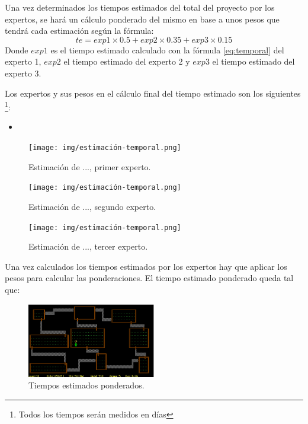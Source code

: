         Una vez determinados los tiempos estimados del total del proyecto por los expertos, se hará un cálculo ponderado del mismo en base a unos pesos que tendrá cada estimación según la fórmula:
        \begin{equation}
            te = exp1 \times 0.5 + exp2 \times 0.35 + exp3 \times 0.15 \label{eq:ponderado}
        \end{equation}
        Donde $exp1$ es el tiempo estimado calculado con la fórmula \ref{eq:temporal} del experto 1, $exp2$ el tiempo estimado del experto 2 y $exp3$ el tiempo estimado del experto 3.

        Los expertos y sus pesos en el cálculo final del tiempo estimado son los siguientes \footnote{Todos los tiempos serán medidos en días}:
        \begin{itemize}
            \item 
        \end{itemize}

        \begin{figure}
            \centering
            \texttt{[image: img/estimación-temporal.png]}
            \caption{Estimación de ..., primer experto.}
            \label{fig:estimacion1}
        \end{figure}

        \begin{figure}
            \centering
            \texttt{[image: img/estimación-temporal.png]}
            \caption{Estimación de ..., segundo experto.}
            \label{fig:estimacion2}
        \end{figure}

        \begin{figure}
            \centering
            \texttt{[image: img/estimación-temporal.png]}
            \caption{Estimación de ..., tercer experto.}
            \label{fig:estimacion3}
        \end{figure}

        Una vez calculados los tiempos estimados por los expertos hay que aplicar los pesos para calcular las ponderaciones. El tiempo estimado ponderado queda tal que:

        \begin{figure}
            \centering
            \includegraphics[width=0.5\textwidth]{img/Rogue.png}
            \caption{Tiempos estimados ponderados.}
            \label{fig:tiempos-ponderados}
        \end{figure}
        
